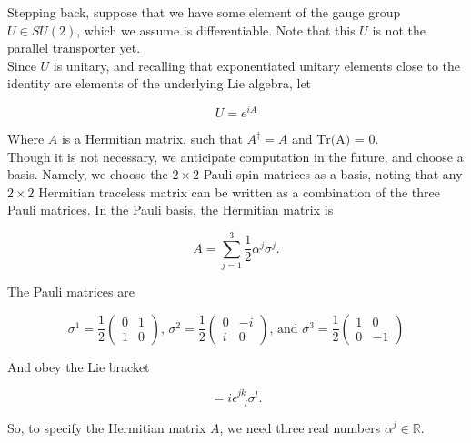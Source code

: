 \noindent Stepping back, suppose that we have some element of the gauge group $U \in SU(2)$, which we assume is differentiable. Note that this $U$ is not the parallel transporter yet. \\

\noindent Since $U$ is unitary, and recalling that exponentiated unitary elements close to the identity are elements of the underlying Lie algebra, let

\begin{equation}
U = e^{i A}
\end{equation}

\noindent Where $A$ is a Hermitian matrix, such that $A^\dagger = A$ and $\text{Tr(A) = 0}$. \\

\noindent Though it is not necessary, we anticipate computation in the future, and choose a basis. Namely, we choose the $2 \times 2$ Pauli spin matrices as a basis, noting that any $2 \times 2$ Hermitian traceless matrix can be written as a combination of the three Pauli matrices. In the Pauli basis, the Hermitian matrix is

\begin{equation}
A = \sum_{j=1}^3 \frac{1}{2} \alpha^j \sigma^j.
\end{equation}

\noindent The Pauli matrices are

\begin{equation}
\sigma^1 = \frac{1}{2} \left( \begin{array}{cc}  0 & 1 \\ 1 & 0 \end{array} \right) 
\text{, } 
\sigma^2 = \frac{1}{2} \left( \begin{array}{cc} 0 & -i \\ i & 0 \end{array} \right) 
\text{, and } 
\sigma^3 = \frac{1}{2} \left( \begin{array}{cc}  1 & 0 \\ 0 & -1 \end{array} \right)
\end{equation}

\noindent And obey the Lie bracket

\begin{equation}
[ \sigma^j, \sigma^k] = i \epsilon^{jk}_{\,\,\,\,\,l} \sigma^l .
\end{equation}

\noindent So, to specify the Hermitian matrix $A$, we need three real numbers $\alpha^j \in \mathbb{R}$. \\

